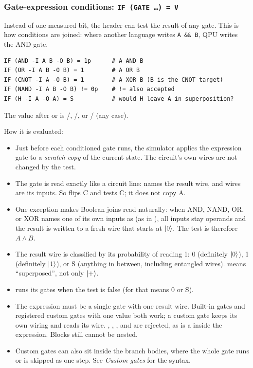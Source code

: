 \subsubsection{Gate-expression conditions: \texttt{IF (GATE \ldots) = V}}
\hypertarget{if-gate-expression}{}

Instead of one measured bit, the header can test the result of any gate. This
is how conditions are joined: where another language writes \texttt{A \&\& B},
QPU writes the AND gate.
\begin{lstlisting}
IF (AND -I A B -O B) = 1p      # A AND B
IF (OR -I A B -O B) = 1        # A OR B
IF (CNOT -I A -O B) = 1        # A XOR B (B is the CNOT target)
IF (NAND -I A B -O B) != 0p    # != also accepted
IF (H -I A -O A) = S           # would H leave A in superposition?
\end{lstlisting}
The value after \code{=} or \code{!=} is /,
/, or / (any case).

How it is evaluated:
\begin{itemize}
  \item Just before each conditioned gate runs, the simulator applies the
  expression gate to a \emph{scratch copy} of the current state. The circuit's
  own wires are not changed by the test.
  \item The gate is read exactly like a circuit line:  names the
  result wire, and  wires are its inputs. So  flips
  C and tests C; it does not copy A.
  \item One exception makes Boolean joins read naturally: when AND, NAND, OR,
  or XOR names one of its own inputs as  (as in
  ), all inputs stay operands and the result is written
  to a fresh wire that starts at $\lvert 0\rangle$. The test is therefore $A \wedge B$.
  \item The result wire is classified by its probability of reading 1: 0
  (definitely $\lvert 0\rangle$), 1 (definitely $\lvert 1\rangle$), or S (anything in between,
  including entangled wires).  means ``superposed'', not only
  $\lvert +\rangle$.
  \item {} runs its gates when the test is false (for 
  that means 0 or S).
  \item The expression must be a single gate with one result wire. Built-in
  gates and registered custom gates with one  value both
  work; a custom gate keeps its own wiring and reads its  wire.
  , , , and  are
  rejected, as is a  inside the expression. Blocks still cannot be
  nested.
  \item Custom gates can also sit inside the branch bodies, where the whole
  gate runs or is skipped as one step. See \emph{Custom gates} for the
  syntax.
\end{itemize}

